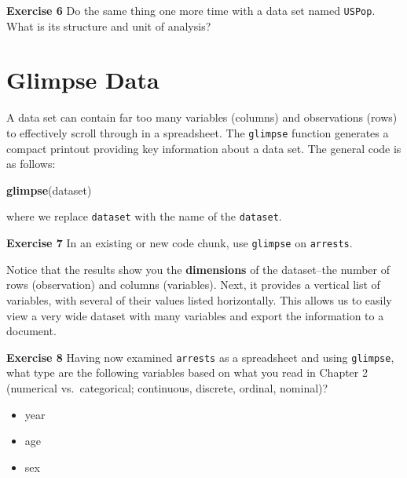 \documentclass[
]{book}
\makeatletter
\newenvironment{Shaded}{\begin{snugshade}}{\end{snugshade}}
\newcommand{\FunctionTok}[1]{\textcolor[rgb]{0.27,0.27,0.27}{\textbf{#1}}}
\newcommand{\NormalTok}[1]{#1}
\providecommand{\tightlist}{%
  \setlength{\itemsep}{0pt}\setlength{\parskip}{0pt}}
\newenvironment{kframe}{%
\medskip{}
\setlength{\fboxsep}{.8em}
 \def\at@end@of@kframe{}%
 \ifinner\ifhmode%
  \def\at@end@of@kframe{\end{minipage}}%
  \begin{minipage}{\columnwidth}%
 \fi\fi%
 \def\FrameCommand##1{\hskip\@totalleftmargin \hskip-\fboxsep
 \colorbox{shadecolor}{##1}\hskip-\fboxsep
     \hskip-\linewidth \hskip-\@totalleftmargin \hskip\columnwidth}%
 \MakeFramed {\advance\hsize-\width
   \@totalleftmargin\z@ \linewidth\hsize
   \@setminipage}}%
 {\par\unskip\endMakeFramed%
 \at@end@of@kframe}
\renewenvironment{Shaded}{\begin{kframe}}{\end{kframe}}
\newenvironment{rmdblock}[1]
  {\begin{shaded*}
  }
  {\end{shaded*}
  }
\newenvironment{learncheck}
  {\begin{rmdblock}{warning}}
  {\end{rmdblock}}
\makeatother
\begin{document}
\begin{learncheck}
\textbf{Exercise 6} Do the same thing one more time with a data set
named \texttt{USPop}. What is its structure and unit of analysis?
\end{learncheck}

\hypertarget{glimpse-data}{%
\section{Glimpse Data}\label{glimpse-data}}

A data set can contain far too many variables (columns) and observations (rows) to effectively scroll through in a spreadsheet. The \texttt{glimpse} function generates a compact printout providing key information about a data set. The general code is as follows:

\begin{Shaded}
\begin{Highlighting}[]
\FunctionTok{glimpse}\NormalTok{(dataset)}
\end{Highlighting}
\end{Shaded}

where we replace \texttt{dataset} with the name of the \texttt{dataset}.

\begin{learncheck}
\textbf{Exercise 7} In an existing or new code chunk, use
\texttt{glimpse} on \texttt{arrests}.
\end{learncheck}

Notice that the results show you the \textbf{dimensions} of the dataset--the number of rows (observation) and columns (variables). Next, it provides a vertical list of variables, with several of their values listed horizontally. This allows us to easily view a very wide dataset with many variables and export the information to a document.

\begin{learncheck}
\textbf{Exercise 8} Having now examined \texttt{arrests} as a
spreadsheet and using \texttt{glimpse}, what type are the following
variables based on what you read in Chapter 2 (numerical
vs.~categorical; continuous, discrete, ordinal, nominal)?

\begin{itemize}
\tightlist
\item
  year
\item
  age
\item
  sex
\end{itemize}
\end{learncheck}
\end{document}
